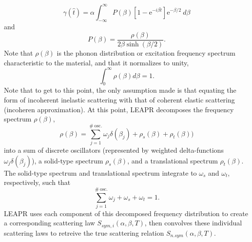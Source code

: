 \documentclass[../master.tex]{subfiles}
\begin{document}
			\begin{equation} 
				\gamma(\hat{t})=\alpha\int_{-\infty}^{\infty}P(\beta)\left[1-\mathrm{e}^{-i\beta\hat{t}}\right]\mathrm{e}^{-\beta/2}~d\beta\label{eq:gamma}
			\end{equation}
			and
			\begin{equation}
				P(\beta)=\frac{\rho(\beta)}{2\beta\sinh(\beta/2)}.
			\end{equation}
			Note that $\rho(\beta)$ is the phonon distribution or excitation frequency spectrum characteristic to the material, and that it normalizes to unity,
			\begin{equation}
				\int_{0}^{\infty}\rho(\beta)d\beta=1.
			\end{equation}
			Note that to get to this point, the only assumption made is that equating the form of incoherent inelastic scattering with that of coherent elastic scattering (incoheren approximation). At this point, LEAPR decomposes the frequency spectrum $\rho(\beta)$,
			\begin{equation}
				\rho(\beta)=\sum_{j=1}^{\#~\mbox{osc.}}\omega_j\delta(\beta_j)+\rho_s(\beta)+\rho_t(\beta))
			\end{equation}
			into a sum of discrete oscillators (represented by weighted delta-functions $\omega_j\delta(\beta_j)$), a solid-type spectrum $\rho_s(\beta)$, and a translational spectrum $\rho_t(\beta)$. The solid-type spectrum and translational spectrum integrate to $\omega_s$ and $\omega_t$, respectively, such that 
			\begin{equation}
                          \sum_{j=1}^{\#~\mbox{osc.}}\omega_j + \omega_s + \omega_t = 1.\label{eq:weightsSumTo1}
			\end{equation}
			LEAPR uses each component of this decomposed frequency distribution to create a corresponding scattering law $S_{sym,i}(\alpha,\beta,T)$, then convolves these individual scattering laws to retreive the true scattering relation $S_{n.sym}(\alpha,\beta,T)$.
\end{document}
